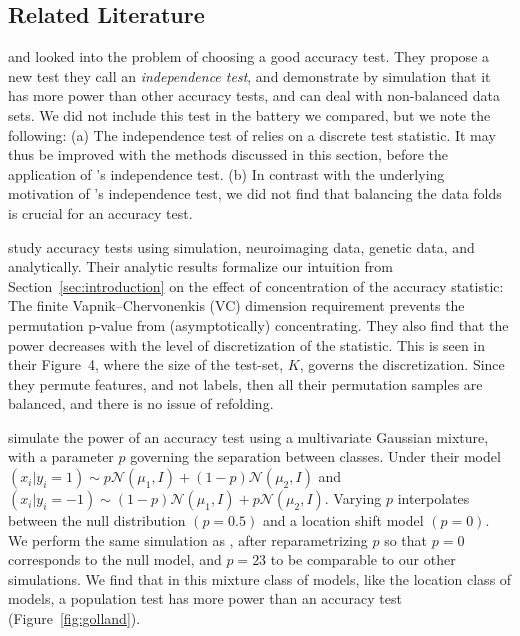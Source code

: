 \documentclass[12pt,a4paper]{article}
\theoremstyle{definition}
\newcommand{\gauss}[1]{\mathcal{N}\left(#1\right)} %
\begin{document}
\subsection{Related Literature}
\cite{olivetti_induction_2012} and \cite{olivetti_statistical_2014} looked into the problem of choosing a good accuracy test. 
They propose a new test they call an \emph{independence test}, and demonstrate by simulation that it has more power than other accuracy tests, and can deal with non-balanced data sets. 
We did not include this test in the battery we compared, but we note the following: 
(a) The independence test of \cite{olivetti_induction_2012} relies on a discrete test statistic. It may thus be improved with the methods discussed in this section, before the application of \cite{olivetti_induction_2012}'s independence test. 
(b) In contrast with the underlying motivation of \cite{olivetti_induction_2012}'s independence test, we did not find that balancing the data folds is crucial for an accuracy test. 


\cite{golland_permutation_2005} study accuracy tests using simulation, neuroimaging data, genetic data, and analytically.
Their analytic results formalize our intuition from Section~\ref{sec:introduction} on the effect of concentration of the accuracy statistic:
The finite Vapnik–Chervonenkis (VC) dimension requirement \citep[Sec 4.3]{golland_permutation_2003} prevents the permutation p-value from (asymptotically) concentrating. 
They also find that the power decreases with the level of discretization of the statistic. 
This is seen in their Figure~4, where the size of the test-set, $K$, governs the discretization. 
Since they permute features, and not labels, then all their permutation samples are balanced, and there is no issue of refolding. 

\cite{golland_permutation_2005} simulate the power of an accuracy test using a multivariate Gaussian mixture, with a parameter $p$ governing the separation between classes. 
Under their model 
$(x_i|y_i=1) \sim p \gauss{\mu_1,I}+ (1-p) \gauss{\mu_2,I}$ 
and 
$(x_i|y_i=-1) \sim (1-p) \gauss{\mu_1,I}+ p \gauss{\mu_2,I}$.
Varying $p$ interpolates between the null distribution $(p=0.5)$ and a location shift model $(p=0)$. 
We perform the same simulation as \cite{golland_permutation_2005}, after reparametrizing $p$ so that $p=0$ corresponds to the null model, and $p=23$ to be comparable to our other simulations.
We find that in this mixture class of models, like the location class of models, a population test has more power than an accuracy test (Figure~\ref{fig:golland}).
\end{document}
